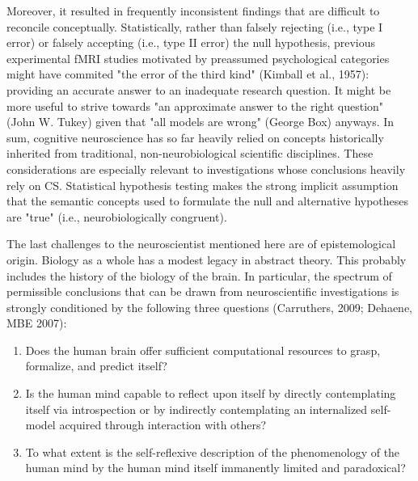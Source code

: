 \documentclass[authoryear,review,3p]{elsarticle}
\begin{document}
Moreover, it resulted in frequently inconsistent findings
that are difficult to reconcile conceptually.
%
Statistically, rather than falsely rejecting (i.e., type I error) or
falsely accepting (i.e., type II error) the null hypothesis,
previous experimental fMRI studies motivated by
preassumed psychological categories might have commited
"the error of the third kind" (Kimball et al., 1957):
providing an accurate answer to an inadequate research question.
It might be more useful to
strive towards "an approximate answer to the right question"
(John W. Tukey) given that "all models are wrong" (George Box) anyways.
%
In sum,
cognitive neuroscience has so far heavily relied on concepts
historically inherited from traditional,
non-neurobiological scientific disciplines.
These considerations are especially relevant to investigations
whose conclusions heavily rely on CS.
Statistical hypothesis testing makes the
strong implicit assumption that
the semantic concepts used to formulate 
the null and alternative hypotheses are "true"
(i.e., neurobiologically congruent).

The last challenges to the neuroscientist
mentioned here are of epistemological origin.
Biology as a whole has a modest legacy in abstract theory.
This probably includes the history of the biology of the brain.
In particular,
the spectrum of permissible conclusions
that can be drawn from neuroscientific investigations is strongly conditioned
by the following three questions
(Carruthers, 2009; Dehaene, MBE 2007):
\begin{enumerate}
  \item Does the human brain offer sufficient computational resources
  to grasp, formalize, and predict itself?
  \item Is the human mind capable to reflect upon itself
by directly contemplating itself via introspection or by
indirectly contemplating an internalized self-model acquired through
interaction with others?
  \item To what extent is the self-reflexive description of the phenomenology of
  the human mind by the human mind itself immanently
  limited and paradoxical?
\end{enumerate}
\end{document}
